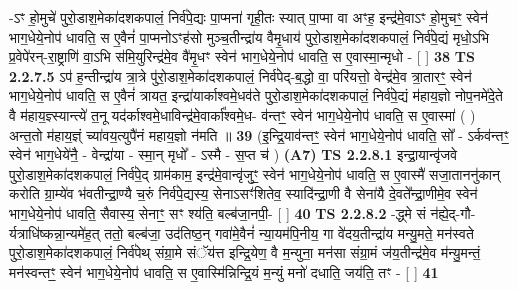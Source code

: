 \documentclass[17pt]{extarticle}
\begin{document}
                  -ऽꣳ हो॒मुचे॑ पुरो॒डाश॒मेका॑दशकपालं॒ निर्व॑पे॒द्यः पा॒प्मना॑ गृही॒तः स्यात् पा॒प्मा वा अꣳह॒ इन्द्र॑मे॒वाऽꣳ हो॒मुचꣳ॒॒ स्वेन॑ भाग॒धेये॒नोप॑ धावति॒ स ए॒वैनं॑ पा॒प्मनोऽꣳह॑सो मुञ्च॒तीन्द्रा॑य वैमृ॒धाय॑ पुरो॒डाश॒मेका॑दशकपालं॒ निर्व॑पे॒द्यं मृधो॒ऽभि प्र॒वेपे॑रन्-रा॒ष्ट्राणि॑ वा॒ऽभि स॑मि॒युरिन्द्र॑मे॒व वै॑मृ॒धꣳ स्वेन॑ भाग॒धेये॒नोप॑ धावति॒ स ए॒वास्मा॒न्मृधो - [  ] \textbf{  38} \newline
                  \newline
                                \textbf{ TS 2.2.7.5} \newline
                  ऽप॑ ह॒न्तीन्द्रा॑य त्रा॒त्रे पु॑रो॒डाश॒मेका॑दशकपालं॒ निर्व॑पेद्-ब॒द्धो वा॒ परि॑यत्तो॒ वेन्द्र॑मे॒व त्रा॒तारꣳ॒॒ स्वेन॑ भाग॒धेये॒नोप॑ धावति॒ स ए॒वैनं॑ त्रायत॒ इन्द्रा॑यार्काश्वमे॒धव॑ते पुरो॒डाश॒मेका॑दशकपालं॒ निर्व॑पे॒द्यं म॑हाय॒ज्ञो नोप॒नमे॑दे॒ते वै म॑हाय॒ज्ञ्स्यान्त्ये॑ त॒नू यद॑र्काश्वमे॒धाविन्द्र॑मे॒वार्का᳚श्वमे॒ध- व॑न्तꣳ॒॒ स्वेन॑ भाग॒धेये॒नोप॑ धावति॒ स ए॒वास्मा॑ ( ) अन्त॒तो म॑हाय॒ज्ञ्ं च्या॑वय॒त्युपै॑नं महाय॒ज्ञो न॑मति ॥ \textbf{  39} \newline
                  \newline
                      (इ॒न्द्रि॒याव॑न्तꣳ॒॒ स्वेन॑ भाग॒धेये॒नोप॑ धावति॒ सो᳚ - ऽर्कव॑न्तꣳ॒॒ स्वेन॑ भाग॒धेये॑नै॒ - वेन्द्रा॑या - स्मा॒न् मृधो᳚ - ऽस्मै - स॒प्त च॑ )  \textbf{(A7)} \newline \newline
                                        \textbf{ TS 2.2.8.1} \newline
                  इन्द्रा॒यान्वृ॑जवे पुरो॒डाश॒मेका॑दशकपालं॒ निर्व॑पे॒द् ग्राम॑काम॒ इन्द्र॑मे॒वान्वृ॑जुꣳ॒॒ स्वेन॑ भाग॒धेये॒नोप॑ धावति॒ स ए॒वास्मै॑ सजा॒ताननु॑कान् करोति ग्रा॒म्ये॑व भ॑वतीन्द्रा॒ण्यै च॒रुं निर्व॑पे॒द्यस्य॒ सेनाऽसꣳ॑शितेव॒ स्यादि॑न्द्रा॒णी वै सेना॑यै दे॒वते᳚न्द्रा॒णीमे॒व स्वेन॑ भाग॒धेये॒नोप॑ धावति॒ सैवास्य॒ सेनाꣳ॒॒ सꣳ श्य॑ति॒ बल्ब॑जा॒नपी॒-  [  ] \textbf{  40} \newline
                  \newline
                                \textbf{ TS 2.2.8.2} \newline
                  -द्ध्मे सं न॑ह्ये॒द्-गौ-र्यत्राधि॑ष्कन्ना॒न्यमे॑ह॒त् ततो॒ बल्ब॑जा॒ उद॑तिष्ठ॒न् गवा॑मे॒वैनं॑ न्या॒यम॑पि॒नीय॒ गा वे॑दय॒तीन्द्रा॑य मन्यु॒मते॒ मन॑स्वते पुरो॒डाश॒मेका॑दशकपालं॒ निर्व॑पेथ् संग्रा॒मे संॅय॑त्त इन्द्रि॒येण॒ वै म॒न्युना॒ मन॑सा संग्रा॒मं ज॑य॒तीन्द्र॑मे॒व म॑न्यु॒मन्तं॒ मन॑स्वन्तꣳ॒॒ स्वेन॑ भाग॒धेये॒नोप॑ धावति॒ स ए॒वास्मि॑न्निन्द्रि॒यं म॒न्युं मनो॑ दधाति॒ जय॑ति॒ तꣳ - [  ] \textbf{  41} \newline
\end{document}
